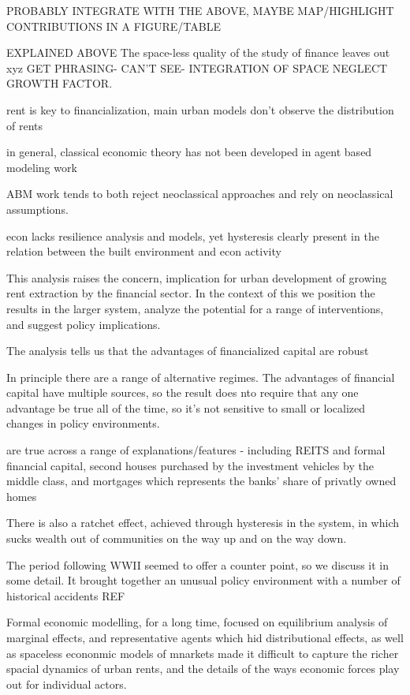 PROBABLY INTEGRATE WITH THE ABOVE, MAYBE MAP/HIGHLIGHT CONTRIBUTIONS IN A FIGURE/TABLE

EXPLAINED ABOVE The space-less quality of the study of finance leaves out xyz GET PHRASING- CAN'T SEE- INTEGRATION OF SPACE NEGLECT GROWTH FACTOR. 

rent is key to financialization, main urban models don't observe the distribution of rents

in general, classical economic theory has not been developed in agent based modeling work

ABM work tends to both reject neoclassical approaches and rely on neoclassical assumptions.

econ lacks resilience analysis and models, yet hysteresis clearly present in the relation between the built environment and econ activity

This analysis raises the concern, implication for urban development of growing rent extraction by the financial sector.   In the context of this we position the results in the larger system, analyze the potential for a range of interventions, and suggest policy implications.



The analysis tells us that the advantages of financialized capital are robust 

In principle there are a range of alternative regimes.
The advantages of financial capital have multiple sources, so the result does nto require that any one advantage be true all of the time, so it's not sensitive to small or localized changes in policy environments.

are true across a range of explanations/features - including REITS and formal financial capital, second houses purchased by the investment vehicles by the middle class, and mortgages which represents the banks' share of privatly owned homes

There is also a ratchet effect, achieved through hysteresis in the system, in which sucks wealth out of communities on the way up and on the way down.

The period following WWII seemed to offer a counter point, so we discuss it in some detail. It brought together an unusual policy environment with a number of historical accidents REF




Formal economic modelling, for a long time, focused on equilibrium analysis of marginal effects, and representative agents which hid distributional effects, as well as spaceless econonmic models of mnarkets made it difficult to capture the richer spacial dynamics of urban rents, and the details of the ways economic forces play out for individual actors.

